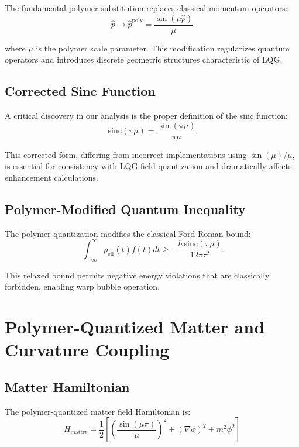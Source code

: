 \documentclass[11pt]{article}
\begin{document}
The fundamental polymer substitution replaces classical momentum operators:
\begin{equation}
\hat{p} \rightarrow \hat{p}^{\text{poly}} = \frac{\sin(\mu \hat{p})}{\mu}
\end{equation}

where $\mu$ is the polymer scale parameter. This modification regularizes quantum operators and introduces discrete geometric structures characteristic of LQG.

\subsection{Corrected Sinc Function}

A critical discovery in our analysis is the proper definition of the sinc function:
\begin{equation}
\boxed{\mathrm{sinc}(\pi\mu) = \frac{\sin(\pi\mu)}{\pi\mu}}
\end{equation}

This corrected form, differing from incorrect implementations using $\sin(\mu)/\mu$, is essential for consistency with LQG field quantization and dramatically affects enhancement calculations.

\subsection{Polymer-Modified Quantum Inequality}

The polymer quantization modifies the classical Ford-Roman bound:
\begin{equation}
\int_{-\infty}^{\infty} \rho_{\text{eff}}(t) f(t) dt \geq -\frac{\hbar\,\mathrm{sinc}(\pi\mu)}{12\pi\tau^2}
\end{equation}

This relaxed bound permits negative energy violations that are classically forbidden, enabling warp bubble operation.

\section{Polymer-Quantized Matter and Curvature Coupling}

\subsection{Matter Hamiltonian}

The polymer-quantized matter field Hamiltonian is:
\begin{equation}
H_{\text{matter}} = \frac{1}{2}\left[\left(\frac{\sin(\mu\pi)}{\mu}\right)^2 + (\nabla\phi)^2 + m^2\phi^2\right]
\end{equation}
\end{document}
